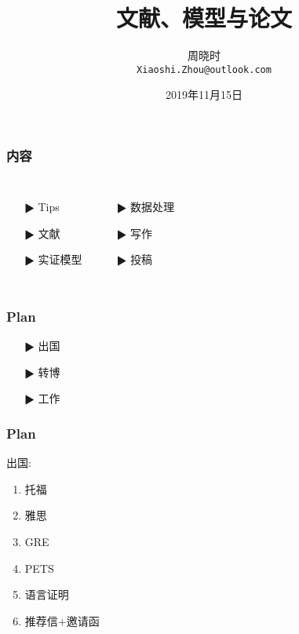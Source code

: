 \documentclass[11pt,mathserif]{beamer} %
\title{文献、模型与论文}
\author{周晓时\\
\texttt{Xiaoshi.Zhou@outlook.com}
}
\date[2019年11月15日]{2019年11月15日}
\begin{document}
\begin{frame}[plain]
\titlepage
\end{frame}

\begin{frame}
  \frametitle{内容}
\begin{columns}

  	\begin{itemize}
    	\item[$\RHD$] Tips
    	\item[$\RHD$] 文献
    	\item[$\RHD$] 实证模型
    \end{itemize}
    
     \begin{itemize}
   		\item[$\RHD$] 数据处理
    	\item[$\RHD$] 写作
    	\item[$\RHD$] 投稿
  	\end{itemize}

\end{columns}
\end{frame}

\begin{frame}
  \frametitle{Plan}

  \begin{itemize}
    \item[$\RHD$] 出国
    \item[$\RHD$] 转博
    \item[$\RHD$] 工作
  \end{itemize}
\end{frame}

\begin{frame}
  \frametitle{Plan}
  \begin{block}{出国:}
    \begin{enumerate}
    	\item 托福
    	\item 雅思
    	\item GRE
    	\item PETS
    	\item 语言证明
    	\item 推荐信+邀请函
    \end{enumerate}
  \end{block}
\end{frame}
\end{document}
